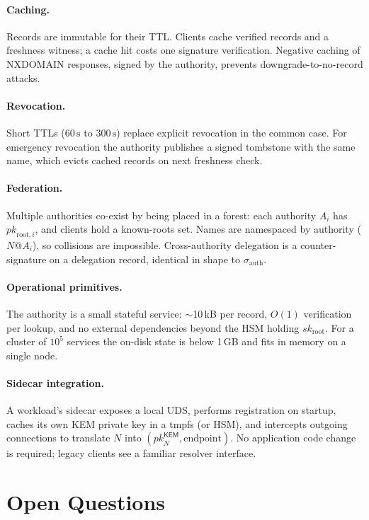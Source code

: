 \documentclass[11pt,a4paper]{article}
\theoremstyle{definition}
\theoremstyle{remark}
\newcommand{\KEM}{\mathsf{KEM}}
\newcommand{\pk}{\mathit{pk}}
\newcommand{\sk}{\mathit{sk}}
\begin{document}
\paragraph{Caching.} Records are immutable for their TTL. Clients cache
verified records and a freshness witness; a cache hit costs one
signature verification. Negative caching of NXDOMAIN responses, signed
by the authority, prevents downgrade-to-no-record attacks.

\paragraph{Revocation.} Short TTLs ($60\,\mathrm{s}$ to
$300\,\mathrm{s}$) replace explicit revocation in the common case. For
emergency revocation the authority publishes a signed tombstone with
the same name, which evicts cached records on next freshness check.

\paragraph{Federation.} Multiple authorities co-exist by being placed
in a forest: each authority $A_i$ has $\pk_{\mathrm{root},i}$, and
clients hold a known-roots set. Names are namespaced by authority
($N@A_i$), so collisions are impossible. Cross-authority delegation
is a counter-signature on a delegation record, identical in shape to
$\sigma_{\mathrm{auth}}$.

\paragraph{Operational primitives.} The authority is a small stateful
service: $\sim$10\,kB per record, $O(1)$ verification per lookup, and
no external dependencies beyond the HSM holding $\sk_{\mathrm{root}}$.
For a cluster of $10^5$ services the on-disk state is below 1\,GB and
fits in memory on a single node.

\paragraph{Sidecar integration.} A workload's sidecar exposes a local
UDS, performs registration on startup, caches its own KEM private key
in a tmpfs (or HSM), and intercepts outgoing connections to translate
$N$ into $(\pk_N^\KEM, \mathrm{endpoint})$. No application code change
is required; legacy clients see a familiar resolver interface.

\section{Open Questions}\label{sec:open}
\end{document}

